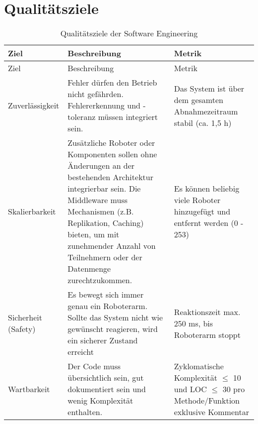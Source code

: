 \newpage
\section{Qualitätsziele}
\begin{longtable}{|>{\raggedright\arraybackslash}p{4cm}|>{\raggedright\arraybackslash}p{5cm}|>{\raggedright\arraybackslash}p{5cm}|}
	\caption{Qualitätsziele der Software Engineering} \label{tab:seziele} \\
	\hline
	Ziel & Beschreibung & Metrik \\
	\hline
	\endfirsthead
	
	\hline
	Ziel & Beschreibung & Metrik \\
	\hline
	\endhead
	
	\hline
	\endfoot
	
	
	Zuverlässigkeit & 
	Fehler dürfen den Betrieb nicht gefährden. Fehlererkennung und -toleranz müssen integriert sein.
	& Das System ist über dem gesamten Abnahmezeitraum stabil (ca. 1,5 h)
	\\
	\hline
	Skalierbarkeit & 
	Zusätzliche Roboter oder Komponenten sollen ohne Änderungen an der bestehenden Architektur integrierbar sein. Die Middleware muss Mechanismen (z.B. Replikation, Caching) bieten, um mit zunehmender Anzahl von Teilnehmern oder der Datenmenge zurechtzukommen.
	& Es können beliebig viele Roboter hinzugefügt und entfernt werden (0 - 253)
	\\
	\hline
	Sicherheit (Safety) & 
	Es bewegt sich immer genau ein Roboterarm. Sollte das System nicht wie gewünscht reagieren, wird ein sicherer Zustand erreicht
	& Reaktionszeit max. 250 ms, bis Roboterarm stoppt
	\\
	\hline
	Wartbarkeit & 
	Der Code muss übersichtlich sein, gut dokumentiert sein und wenig Komplexität enthalten. 
	& Zyklomatische Komplexität $\leq$ 10 und LOC $\leq$ 30 pro Methode/Funktion exklusive Kommentar  
	
	\\
	\hline
	

\end{longtable}
